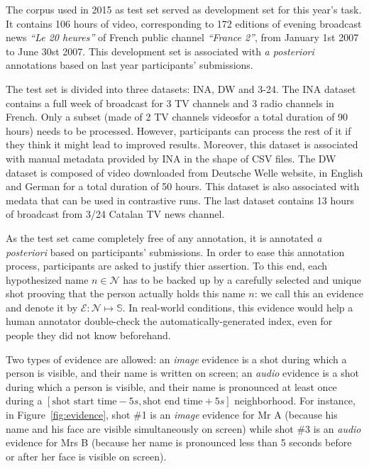 \documentclass{acm_proc_article-me}
\newcommand\shots{\mathbb{S}}
\newcommand\hypEvidences{\mathcal{E}}
\newcommand\hypNames{\mathcal{N}}
\begin{document}
The corpus used in 2015 as test set served as development set for this year's task. It contains 106 hours of video, corresponding to 172 editions of evening broadcast news \emph{``Le 20 heures''} of French public channel \emph{``France 2''}, from January 1st 2007 to June 30st 2007. This development set is associated with \emph{a posteriori} annotations based on last year participants' submissions. 

The test set is divided into three datasets: INA, DW and 3-24. The INA dataset contains a full week of broadcast for 3 TV channels and 3 radio channels in French. Only a subset (made of 2 TV channels videosfor a total duration of 90 hours) needs to be processed. However, participants can process the rest of it if they think it might lead to improved results. Moreover, this dataset is associated with manual metadata provided by INA in the shape of CSV files. The DW dataset is composed of video downloaded from Deutsche Welle website, in English and German for a total duration of 50 hours. This dataset is also associated with medata that can be used in contrastive runs. The last dataset contains 13 hours of broadcast from 3/24 Catalan TV news channel.

As the test set came completely free of any annotation, it is annotated \emph{a posteriori} based on participants' submissions. 
In order to ease this annotation process, participants are asked to justify thier assertion. To this end, each hypothesized name $n \in \hypNames$ has to be backed up by a carefully selected and unique shot prooving that the person actually holds this name $n$: we call this an evidence and denote it by $\hypEvidences : \hypNames \mapsto \shots$. In real-world conditions, this evidence would help a human annotator double-check the automatically-generated index, even for people they did not know beforehand.

Two types of evidence are allowed: an \emph{image} evidence is a shot during which a person is visible, and their name is written on screen; an \emph{audio} evidence is a shot during which a person is visible, and their name is pronounced at least once during a $[\text{shot start time} - 5s, \text{shot end time} + 5s ]$ neighborhood.
For instance, in Figure~\ref{fig:evidence}, shot \#1 is an \emph{image} evidence for Mr A (because his name and his face are visible simultaneously on screen) while shot \#3 is an \emph{audio} evidence for Mrs B (because her name is pronounced less than 5 seconds before or after her face is visible on screen).
\end{document}
